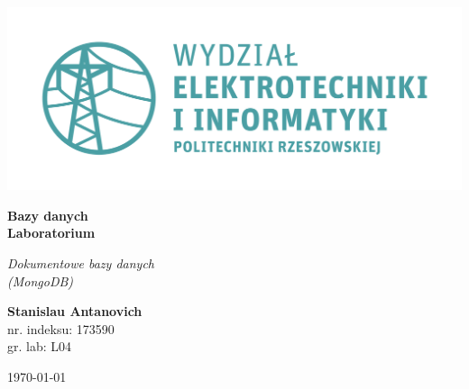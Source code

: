\documentclass{article}
\begin{document}
\begin{titlepage}
\begin{center}
	\includegraphics[scale=0.7]{logo.png}

	\vspace*{4cm}
	\textbf{Bazy danych\\ Laboratorium}

	\vspace{1.5cm}
	\textit{Dokumentowe bazy danych\\ (MongoDB)}

	\vspace{1.5cm}
	\textbf{Stanislau Antanovich}\\
	nr. indeksu: 173590\\
	gr. lab: L04

	\vspace{4.5cm}
	\today
\end{center}
\end{titlepage}
\end{document}
